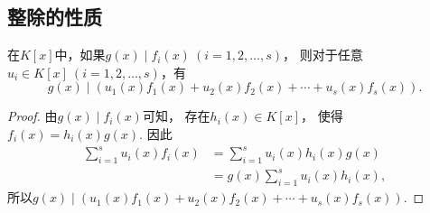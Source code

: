 \subsection{整除的性质}
\begin{proposition}\label{theorem:多项式.整除的线性性}
在\(K[x]\)中，如果\(g(x) \mid f_i(x)\ (i=1,2,\dotsc,s)\)，
则对于任意\(u_i \in K[x]\ (i=1,2,\dotsc,s)\)，有\[
	g(x) \mid (u_1(x) f_1(x) + u_2(x) f_2(x) + \dotsb + u_s(x) f_s(x)).
\]
\begin{proof}
由\(g(x) \mid f_i(x)\)可知，
存在\(h_i(x) \in K[x]\)，
使得\(f_i(x) = h_i(x) g(x)\).
因此\begin{align*}
	\sum_{i=1}^s u_i(x) f_i(x)
	&= \sum_{i=1}^s u_i(x) h_i(x) g(x) \\
	&= g(x) \sum_{i=1}^s u_i(x) h_i(x),
\end{align*}
所以\(g(x) \mid (u_1(x) f_1(x) + u_2(x) f_2(x) + \dotsb + u_s(x) f_s(x))\).
\end{proof}
\end{proposition}

